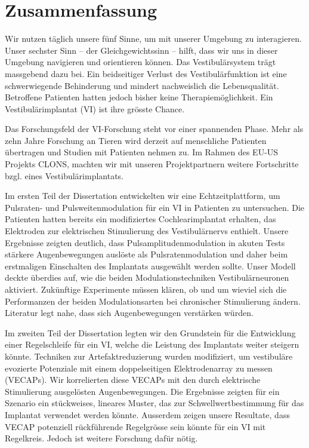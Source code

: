  
%
\vfill

\pagebreak


\chapter*{Zusammenfassung}
Wir nutzen täglich unsere fünf Sinne, um mit unserer Umgebung zu interagieren. Unser sechster Sinn -- der Gleichgewichtssinn -- hilft, dass wir uns in dieser Umgebung navigieren und orientieren können. Das Vestibulärsystem trägt massgebend dazu bei. Ein beidseitiger Verlust des Vestibulärfunktion ist eine schwerwiegende Behinderung und mindert nachweislich die Lebensqualität. Betroffene Patienten hatten jedoch bisher keine Therapiemöglichkeit. Ein Vestibulärimplantat (VI) ist ihre grösste Chance.

Das Forschungsfeld der VI-Forschung steht vor einer spannenden Phase. Mehr als zehn Jahre Forschung an Tieren wird derzeit auf menschliche Patienten übertragen und Studien mit Patienten nehmen zu. Im Rahmen des EU-US Projekts CLONS, machten wir mit unseren Projektpartnern weitere Fortschritte bzgl. eines Vestibulärimplantats.

Im ersten Teil der Dissertation entwickelten wir eine Echtzeitplattform, um Pulsraten- und Pulsweitenmodulation für ein VI in Patienten zu untersuchen. Die Patienten hatten bereits ein modifiziertes Cochlearimplantat erhalten, das Elektroden zur elektrischen Stimulierung des Vestibulärnervs enthielt. Unsere Ergebnisse zeigten deutlich, dass Pulsamplitudenmodulation in akuten Tests stärkere Augenbewegungen auslöste als Pulsratenmodulation und daher beim erstmaligen Einschalten des Implantats ausgewählt werden sollte. Unser Modell deckte überdies auf, wie die beiden Modulationstechniken Vestibulärneuronen aktiviert. Zukünftige Experimente müssen klären, ob und um wieviel sich die Performanzen der beiden Modulationsarten bei chronischer Stimulierung ändern. Literatur legt nahe, dass sich Augenbewegungen verstärken würden.

Im zweiten Teil der Dissertation legten wir den Grundstein für die Entwicklung einer Regelschleife für ein VI, welche die Leistung des Implantats weiter steigern könnte. Techniken zur Artefaktreduzierung wurden modifiziert, um vestibuläre evozierte Potenziale mit einem doppelseitigen Elektrodenarray zu messen (VECAPs). Wir korrelierten diese VECAPs mit den durch elektrische Stimulierung ausgelösten Augenbewegungen. Die Ergebnisse zeigten für ein Szenario ein stückweises, lineares Muster, das zur Schwellwertbestimmung für das Implantat verwendet werden könnte. Ausserdem zeigen unsere Resultate, dass VECAP potenziell rückführende Regelgrösse sein könnte für ein VI mit Regelkreis. Jedoch ist weitere Forschung dafür nötig.



\endgroup

\vfill